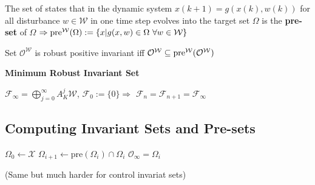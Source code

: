 \begin{definition}
	The set of states that
	in the dynamic system $x(k+1) = g(x(k),w(k))$
	for all disturbance $w\in\mathcal{W}$
	in one time step evolves into the target set $\Omega$
	is the \textbf{pre-set} of $\Omega$
	$\Rightarrow \operatorname{pre}^\mathcal{W}(\Omega) :=
		\{x|g(x,w)\in \Omega\ \forall w\in\mathcal{W}\}$
\end{definition}

\begin{theorem}
	Set $\mathcal{O}^\mathcal{W}$
	is robust positive invariant iff
	$\mathcal{O}^\mathcal{W} \subseteq
		\operatorname{pre}^\mathcal{W}(\mathcal{O}^\mathcal{W})$
\end{theorem}

\textbf{Minimum Robust Invariant Set}

$\mathcal{F}_\infty = \bigoplus_{j=0}^\infty A_K^j \mathcal{W}$,
$\mathcal{F}_0 := \{0\}\Rightarrow$
$\mathcal{F}_n = \mathcal{F}_{n+1} = \mathcal{F}_\infty$%


%



\subsection{Computing Invariant Sets and Pre-sets}


\begin{minipage}{0.53\linewidth}
	\begin{sstFullFrame}[ForestGreen]
		\color{white}
		\begin{algorithmic}
			\State $\Omega_0 \leftarrow \mathcal{X}$
			\Loop
			\State $\Omega_{i+1} \leftarrow \mathrm{pre}(\Omega_i)\cap\Omega_i$
			\State\Return $\mathcal{O}_\infty = \Omega_i$
			\EndIf
			\EndLoop
		\end{algorithmic}
	\end{sstFullFrame}
\end{minipage}

(Same but much harder for control invariat sets)


